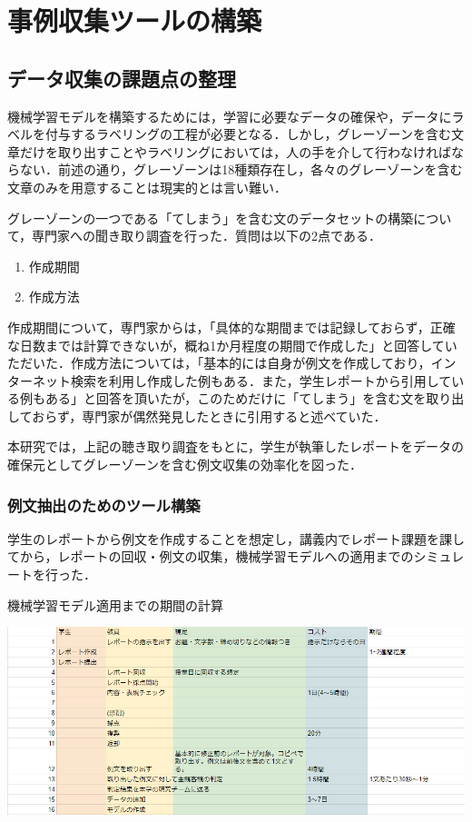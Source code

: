 \chapter{事例収集ツールの構築 \label{c5}}

\section{データ収集の課題点の整理 \label{c5s1}}
機械学習モデルを構築するためには，学習に必要なデータの確保や，データにラベルを付与するラベリングの工程が必要となる．しかし，グレーゾーンを含む文章だけを取り出すことやラベリングにおいては，人の手を介して行わなければならない．前述の通り，グレーゾーンは18種類存在し，各々のグレーゾーンを含む文章のみを用意することは現実的とは言い難い．

グレーゾーンの一つである「てしまう」を含む文のデータセットの構築について，専門家への聞き取り調査を行った．質問は以下の2点である．

\begin{enumerate}
    \item 作成期間
    \item 作成方法
\end{enumerate}

作成期間について，専門家からは，「具体的な期間までは記録しておらず，正確な日数までは計算できないが，概ね1か月程度の期間で作成した」と回答していただいた．作成方法については，「基本的には自身が例文を作成しており，インターネット検索を利用し作成した例もある．また，学生レポートから引用している例もある」と回答を頂いたが，このためだけに「てしまう」を含む文を取り出しておらず，専門家が偶然発見したときに引用すると述べていた．

本研究では，上記の聴き取り調査をもとに，学生が執筆したレポートをデータの確保元としてグレーゾーンを含む例文収集の効率化を図った．

\subsection{例文抽出のためのツール構築}
学生のレポートから例文を作成することを想定し，講義内でレポート課題を課してから，レポートの回収・例文の収集，機械学習モデルへの適用までのシミュレートを行った．

\begin{table}[H]
	\centering
        \caption{機械学習モデル適用までの期間の計算}
 	\includegraphics[width=150mm]{image/systemsimurate.png}
	\label{simurate}
\end{table}

